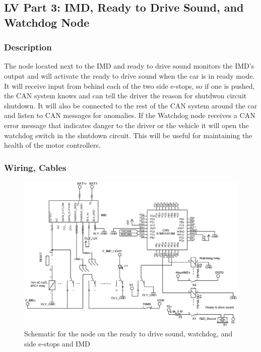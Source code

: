 \documentclass{article}
\begin{document}
    \subsection{LV Part 3: IMD, Ready to Drive Sound, and Watchdog Node} \label{imdnode}

        \subsubsection{Description}

            The node located next to the IMD and ready to drive sound monitors the IMD's output and will activate the ready to drive sound when the car is in ready mode. It will receive input from behind each of the two side e-stops, so if one is pushed, the CAN system knows and can tell the driver the reason for shutdwon circuit shutdown. It will also be connected to the rest of the CAN system around the car and listen to CAN messages for anomalies. If the Watchdog node receives a CAN error message that indicates danger to the driver or the vehicle it will open the watchdog switch in the shutdown circuit. This will be useful for maintaining the health of the motor controllers. 

        \subsubsection{Wiring, Cables}

            \begin{figure}[H]
            \centering
            \includegraphics[width = 0.8 \textwidth]{IMDandCANschem}
            \caption{Schematic for the node on the ready to drive sound, watchdog, and side e-stops and IMD}
            \label{panelnode}
            \end{figure}
            
\end{document}
